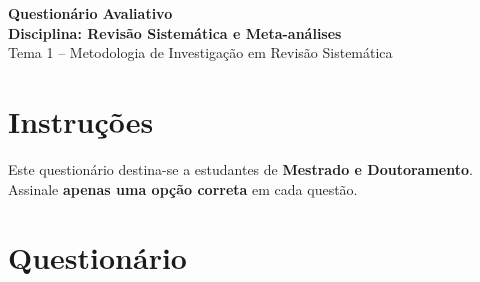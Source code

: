 \documentclass[12pt,a4paper]{article}
\begin{document}
\begin{center}
\Large \textbf{Questionário Avaliativo}\\
\vspace{0.2cm}
\large \textbf{Disciplina: Revisão Sistemática e Meta-análises}\\
\vspace{0.2cm}
\normalsize Tema 1 – Metodologia de Investigação em Revisão Sistemática
\end{center}

\vspace{0.5cm}

\section*{Instruções}
Este questionário destina-se a estudantes de \textbf{Mestrado e Doutoramento}.  
Assinale \textbf{apenas uma opção correta} em cada questão.

\vspace{0.5cm}

\section*{Questionário}
\end{document}
